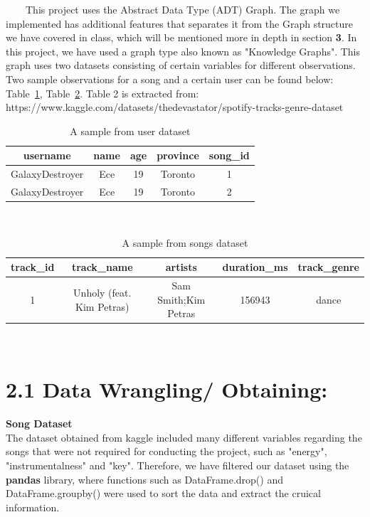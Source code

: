 \documentclass[fontsize=11pt]{article}
\numberwithin{equation}{section}
\theoremstyle{plain} %
\theoremstyle{definition}
\theoremstyle{remark}
\begin{document}
$\qquad$This project uses the Abstract Data Type (ADT) Graph. The graph we implemented has additional features that separates it from the Graph structure we have covered in class, which will be mentioned more in depth in section \textbf{3}. In this project, we have used a graph type also known as "Knowledge Graphs". This graph uses two datasets consisting of certain variables for different observations. Two sample observations for a song and a certain user can be found below: Table~\ref{tab:table1}, Table~\ref{tab:table2}. Table 2 is extracted from: https://www.kaggle.com/datasets/thedevastator/spotify-tracks-genre-dataset 
\\
\begin{table} [h!]
    \centering
    \begin{tabular}{|c|c|c|c|c|}
        \hline
        \textbf{username} & \textbf{name} & \textbf{age} & \textbf{province} & \textbf{song\_id} \\ \hline
        GalaxyDestroyer & Ece & 19 & Toronto & 1 \\ \hline
        GalaxyDestroyer & Ece & 19 & Toronto & 2 \\ \hline
        
    \end{tabular}
    \caption{A sample from user dataset}
    \label{tab:table1}
\end{table}
\\
\begin{table}[h!]
    \centering
    \begin{tabular}{|c|c|c|c|c|}
        \hline
        \textbf{track\_id} & \textbf{track\_name} & \textbf{artists} & \textbf{duration\_ms} & \textbf{track\_genre} \\ \hline
        1 & Unholy (feat. Kim Petras) & Sam Smith;Kim Petras & 156943 & dance \\ \hline
    \end{tabular}
    \caption{A sample from songs dataset}
    \label{tab:table2}
\end{table}
\\

\section*{2.1 Data Wrangling/ Obtaining:}
\textbf{Song Dataset}
\\

The dataset obtained from kaggle included many different variables regarding the songs that were not required for conducting the project, such as "energy", "instrumentalness" and "key". Therefore, we have filtered our dataset using the \textbf{pandas} library, where functions such as DataFrame.drop() and DataFrame.groupby() were used to sort the data and extract the cruical information. 
\end{document}
